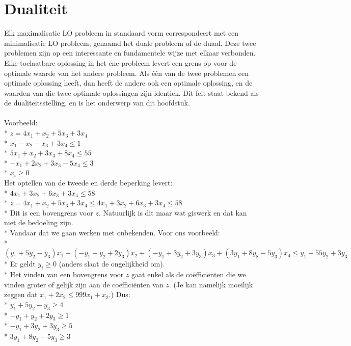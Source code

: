 \documentclass[10pt]{article}
\begin{document}
\section{Dualiteit}
Elk maximalisatie LO probleem in standaard vorm correspondeert met een minimalisatie LO probleem, genaamd het duale probleem of de duaal. Deze twee problemen zijn op een interessante en fundamentele wijze met elkaar verbonden. Elke toelaatbare oplossing in het ene probleem levert een grens op voor de optimale waarde van het andere probleem. Als \'e\'en van de twee problemen een optimale oplossing heeft, dan heeft de andere ook een optimale oplossing, en de waarden van die twee optimale oplossingen zijn identiek. Dit feit staat bekend als de dualiteitsstelling, en is het onderwerp van dit hoofdstuk.\\\\
Voorbeeld:\\*
$z = 4x_1 + x_2 + 5x_3 + 3x_4$\\*
$x_1 - x_2 - x_3 + 3x_4 \le 1$\\*
$5x_1 + x_2 + 3x_3 + 8x_4 \le 55$\\*
$-x_1 + 2x_2 + 3x_3 - 5x_4 \le 3$\\*
$x_i \ge 0$\\
Het optellen van de tweede en derde beperking levert:\\*
$4x_1 + 3x_2 + 6x_3 + 3x_4 \le 58$\\*
$z = 4x_1 + x_2 + 5x_3 + 3x_4 \le 4x_1 + 3x_2 + 6x_3 + 3x_4 \le 58$\\*
Dit is een bovengrens voor $z$. Natuurlijk is dit maar wat giswerk en dat kan niet de bedoeling zijn.\\*
Vandaar dat we gaan werken met onbekenden. Voor ons voorbeeld:\\*
$(y_1 + 5y_2 - y_3)x_1 + (-y_1 + y_2 + 2y_3)x_2 + (-y_1 + 3y_2 +3y_3)x_3 + (3y_1 + 8y_8 - 5y_3)x_4 \le y_1 + 55y_2 + 3y_3$\\*
Er geldt $y_i \ge 0$ (anders slaat de ongelijkheid om).\\*
Het vinden van een bovengrens voor $z$ gaat enkel als de co\"effici\"enten die we vinden groter of gelijk zijn aan de co\"effici\"enten van $z$. (Je kan namelijk moeilijk zeggen dat $x_1 + 2x_2 \le 999x_1 + x_2$.) Dus:\\*
$y_1 + 5y_2 - y_3 \ge 4$\\*
$-y_1 + y_2 + 2y_3 \ge 1$\\*
$-y_1 + 3y_2 + 3y_3 \ge 5$\\*
$3y_1 + 8y_2 - 5y_3 \ge 3$\\
\end{document}
